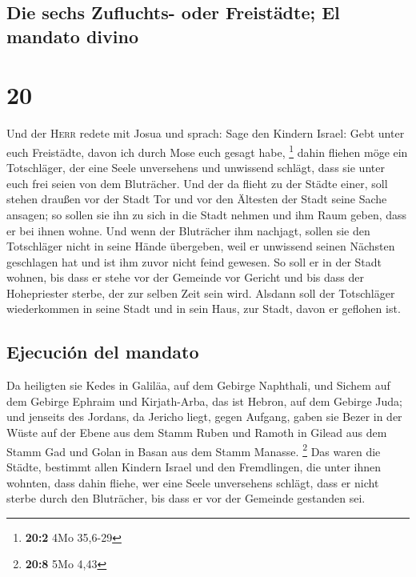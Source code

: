 \hypertarget{die-sechs-zufluchts--oder-freistuxe4dte-el-mandato-divino}{%
\subsection{Die sechs Zufluchts- oder Freistädte; El mandato
divino}\label{die-sechs-zufluchts--oder-freistuxe4dte-el-mandato-divino}}

\hypertarget{section-19}{%
\section{20}\label{section-19}}

 Und der \textsc{Herr} redete mit Josua und sprach:
 Sage den Kindern Israel: Gebt unter euch Freistädte,
davon ich durch Mose euch gesagt habe, \footnote{\textbf{20:2} 4Mo
  35,6-29}  dahin fliehen möge ein Totschläger, der eine
Seele unversehens und unwissend schlägt, dass sie unter euch frei seien
von dem Bluträcher.  Und der da flieht zu der Städte
einer, soll stehen draußen vor der Stadt Tor und vor den Ältesten der
Stadt seine Sache ansagen; so sollen sie ihn zu sich in die Stadt nehmen
und ihm Raum geben, dass er bei ihnen wohne.  Und wenn der
Bluträcher ihm nachjagt, sollen sie den Totschläger nicht in seine Hände
übergeben, weil er unwissend seinen Nächsten geschlagen hat und ist ihm
zuvor nicht feind gewesen.  So soll er in der Stadt
wohnen, bis dass er stehe vor der Gemeinde vor Gericht und bis dass der
Hohepriester sterbe, der zur selben Zeit sein wird. Alsdann soll der
Totschläger wiederkommen in seine Stadt und in sein Haus, zur Stadt,
davon er geflohen ist.

\hypertarget{ejecuciuxf3n-del-mandato}{%
\subsection{Ejecución del mandato}\label{ejecuciuxf3n-del-mandato}}

 Da heiligten sie Kedes in Galiläa, auf dem Gebirge
Naphthali, und Sichem auf dem Gebirge Ephraim und Kirjath-Arba, das ist
Hebron, auf dem Gebirge Juda;  und jenseits des Jordans,
da Jericho liegt, gegen Aufgang, gaben sie Bezer in der Wüste auf der
Ebene aus dem Stamm Ruben und Ramoth in Gilead aus dem Stamm Gad und
Golan in Basan aus dem Stamm Manasse. \footnote{\textbf{20:8} 5Mo 4,43}
 Das waren die Städte, bestimmt allen Kindern Israel und
den Fremdlingen, die unter ihnen wohnten, dass dahin fliehe, wer eine
Seele unversehens schlägt, dass er nicht sterbe durch den Bluträcher,
bis dass er vor der Gemeinde gestanden sei.

